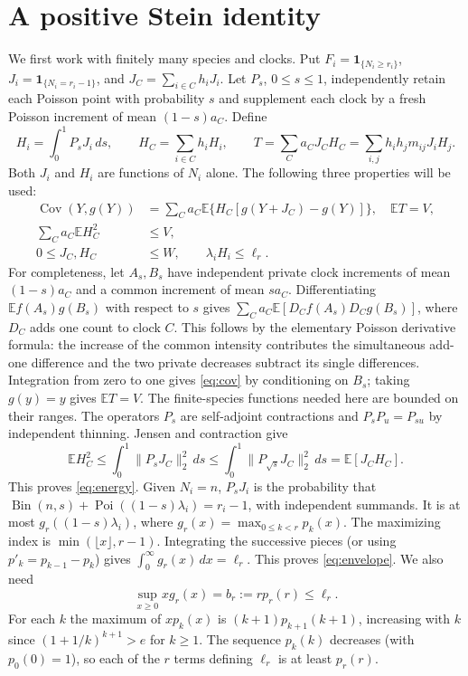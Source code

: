 \documentclass[11pt]{article}
\newcommand{\E}{\mathbb E}
\newcommand{\Cov}{\operatorname{Cov}}
\newcommand{\Poi}{\operatorname{Poi}}
\newcommand{\ind}{\mathbf1}
\numberwithin{equation}{section}
\begin{document}
\section{A positive Stein identity}
We first work with finitely many species and clocks. Put $F_i=\ind_{\{N_i\ge r_i\}}$,
$J_i=\ind_{\{N_i=r_i-1\}}$, and $J_C=\sum_{i\in C}h_iJ_i$. Let $P_s$, $0\le s\le1$, independently retain each
Poisson point with probability $s$ and supplement each clock by a fresh Poisson
increment of mean $(1-s)a_C$. Define
\[
 H_i=\int_0^1 P_sJ_i\,ds,\qquad H_C=\sum_{i\in C}h_iH_i,\qquad
 T=\sum_C a_C J_CH_C=\sum_{i,j}h_i h_jm_{ij}J_iH_j .
\]
Both $J_i$ and $H_i$ are functions of $N_i$ alone. The following three properties will be used:
\begin{align}
 \Cov(Y,g(Y)) &=\sum_C a_C\E\{H_C[g(Y+J_C)-g(Y)]\},\quad \E T=V,\label{eq:cov}\\
 \sum_C a_C\E H_C^2 &\le V,\label{eq:energy}\\
 0\le J_C, H_C&\le W,\qquad \lambda_i H_i\le\ell_r .\label{eq:envelope}
\end{align}
For completeness, let $A_s,B_s$ have independent private clock increments of mean
$(1-s)a_C$ and a common increment of mean $sa_C$. Differentiating
$\E f(A_s)g(B_s)$ with respect to $s$ gives
$\sum_C a_C\E[D_C f(A_s)D_C g(B_s)]$, where $D_C$ adds one count to clock $C$.
This follows by the elementary Poisson derivative formula: the increase of the common
intensity contributes the simultaneous add-one difference and the two private decreases
subtract its single differences. Integration from zero to one gives \eqref{eq:cov}
by conditioning on $B_s$; taking $g(y)=y$ gives $\E T=V$.
The finite-species functions needed here are bounded on their ranges.
The operators $P_s$ are self-adjoint contractions and $P_sP_u=P_{su}$ by independent
thinning. Jensen and contraction give
\[
 \E H_C^2\le\int_0^1\|P_sJ_C\|_2^2\,ds
 \le\int_0^1\|P_{\sqrt s}J_C\|_2^2\,ds=\E[J_C H_C].
\]
This proves \eqref{eq:energy}. Given $N_i=n$, $P_sJ_i$ is the probability that
$\operatorname{Bin}(n,s)+\Poi((1-s)\lambda_i)=r_i-1$, with independent summands.
It is at most $g_r((1-s)\lambda_i)$, where $g_r(x)=\max_{0\le k<r}p_k(x)$.
The maximizing index is $\min(\lfloor x\rfloor,r-1)$. Integrating the successive pieces
(or using $p'_k=p_{k-1}-p_k$) gives $\int_0^\infty g_r(x)\,dx=\ell_r$.
This proves \eqref{eq:envelope}. We also need
\begin{equation}\label{eq:xmode}
 \sup_{x\ge0}xg_r(x)=b_r:=r p_r(r)\le\ell_r .
\end{equation}
For each $k$ the maximum of $xp_k(x)$ is $(k+1)p_{k+1}(k+1)$, increasing with $k$
since $(1+1/k)^{k+1}>e$ for $k\ge1$. The sequence $p_k(k)$ decreases
(with $p_0(0)=1$), so each of the $r$ terms defining $\ell_r$ is at least $p_r(r)$.
\end{document}
